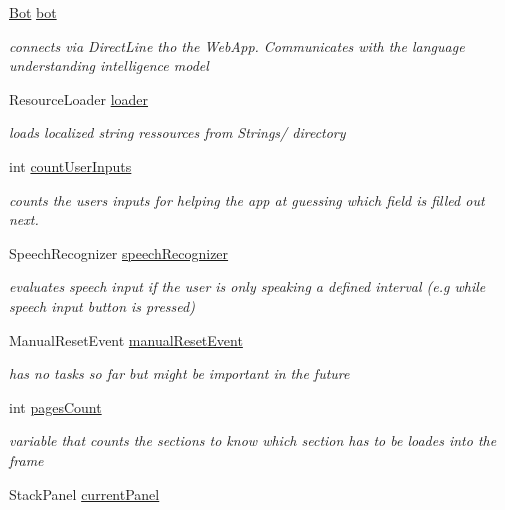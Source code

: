 \begin{DoxyCompactItemize}
\hyperlink{class_listen_to_me_1_1_bot}{Bot} \hyperlink{class_listen_to_me_1_1_main_page_a09b9deff7e80e3d524cd0f12d1c060f9}{bot}
\begin{DoxyCompactList}\small\item\em connects via Direct\+Line tho the Web\+App. Communicates with the language understanding intelligence model \end{DoxyCompactList}\item 
Resource\+Loader \hyperlink{class_listen_to_me_1_1_main_page_a906eb7f1e61084dcfb0b0f833b0d96f4}{loader}
\begin{DoxyCompactList}\small\item\em loads localized string ressources from Strings/ directory \end{DoxyCompactList}\item 
int \hyperlink{class_listen_to_me_1_1_main_page_a94ae31ea5ea90fff0194c7c3345e3987}{count\+User\+Inputs}
\begin{DoxyCompactList}\small\item\em counts the user\textquotesingle{}s inputs for helping the app at guessing which field is filled out next. \end{DoxyCompactList}\item 
Speech\+Recognizer \hyperlink{class_listen_to_me_1_1_main_page_a56393ec41c67e438e12651f5dc44a2cc}{speech\+Recognizer}
\begin{DoxyCompactList}\small\item\em evaluates speech input if the user is only speaking a defined interval (e.\+g while speech input button is pressed) \end{DoxyCompactList}\item 
Manual\+Reset\+Event \hyperlink{class_listen_to_me_1_1_main_page_acc2116e019bacfa54fd25381eeaf363f}{manual\+Reset\+Event}
\begin{DoxyCompactList}\small\item\em has no tasks so far but might be important in the future \end{DoxyCompactList}\item 
int \hyperlink{class_listen_to_me_1_1_main_page_afa885f51f46e84b050d0874e64389880}{pages\+Count}
\begin{DoxyCompactList}\small\item\em variable that counts the sections to know which section has to be loades into the frame \end{DoxyCompactList}\item 
Stack\+Panel \hyperlink{class_listen_to_me_1_1_main_page_a6dbd09c74d99bf0223489a06035980eb}{current\+Panel}

\end{DoxyCompactItemize}
